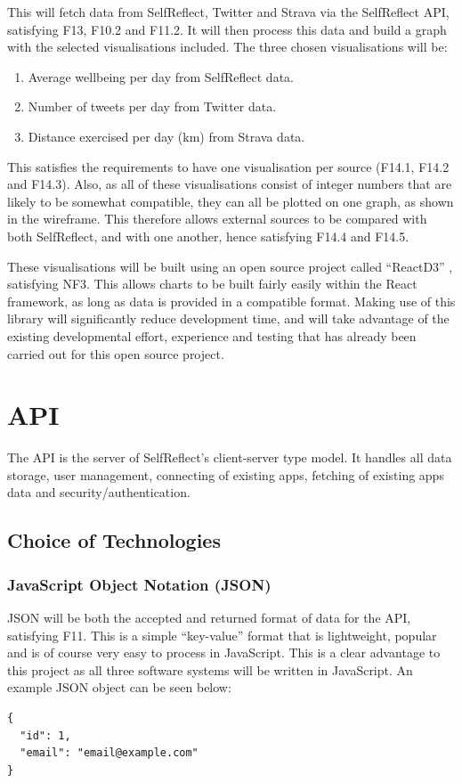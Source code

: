 \documentclass[11pt,openright,a4paper]{report}
\begin{document}
\newpage
This will fetch data from SelfReflect, Twitter and Strava via the SelfReflect API, satisfying F13, F10.2 and F11.2. It will then process this data and build a graph with the selected visualisations included. The three chosen visualisations will be:
\begin{enumerate}
\item Average wellbeing per day from SelfReflect data.
\item Number of tweets per day from Twitter data.
\item Distance exercised per day (km) from Strava data.
\end{enumerate}

This satisfies the requirements to have one visualisation per source (F14.1, F14.2 and F14.3). Also, as all of these visualisations consist of integer numbers that are likely to be somewhat compatible, they can all be plotted on one graph, as shown in the wireframe. This therefore allows external sources to be compared with both SelfReflect, and with one another, hence satisfying F14.4 and F14.5.

These visualisations will be built using an open source project called \enquote{ReactD3} \parencite{reactd3}, satisfying NF3. This allows charts to be built fairly easily within the React framework, as long as data is provided in a compatible format. Making use of this library will significantly reduce development time, and will take advantage of the existing developmental effort, experience and testing that has already been carried out for this open source project.

\section{API} \label{sec:apidesign}
The API is the server of SelfReflect's client-server type model. It handles all data storage, user management, connecting of existing apps, fetching of existing apps data and security/authentication.

\subsection{Choice of Technologies}
\subsubsection{JavaScript Object Notation (JSON)}
JSON will be both the accepted and returned format of data for the API, satisfying F11. This is a simple \enquote{key-value} format that is lightweight, popular and is of course very easy to process in JavaScript. This is a clear advantage to this project as all three software systems will be written in JavaScript. An example JSON object can be seen below:
\begin{lstlisting}
{
  "id": 1,
  "email": "email@example.com"
}
\end{lstlisting}
\end{document}
